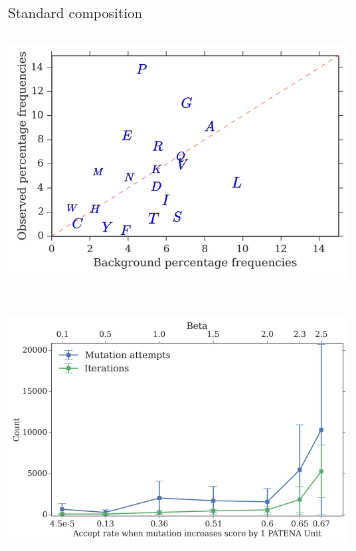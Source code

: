 \documentclass{beamer}
\begin{document}
\begin{frame}
\centering
Standard composition
\begin{adjustwidth}{-1.5em}{-2.5em}
\includegraphics[width=340px,height=250px]{../img/frequenciesComparison.png}\\ 
\end{adjustwidth}
\end{frame}












\begin{frame}
\begin{adjustwidth}{-1.5em}{-2.5em}
\includegraphics[width=340px,height=250px]{../img/beta-vs-Mut-iterations}\\
\end{adjustwidth}
\end{frame}
\end{document}
